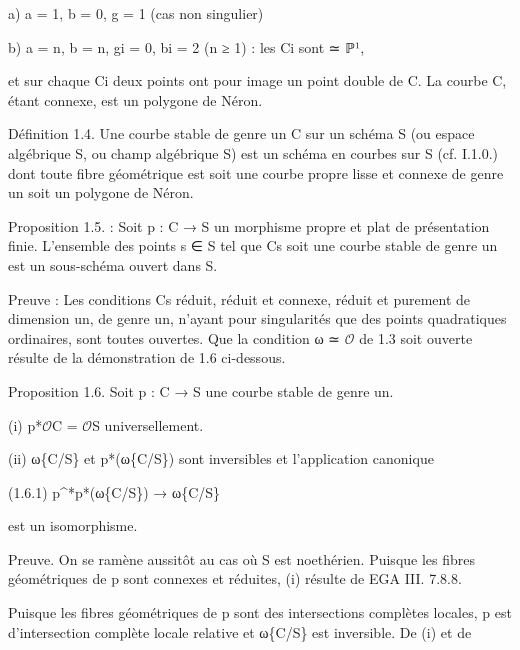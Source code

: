 \documentclass[11pt,a4paper]{article}
\begin{document}
a)    a = 1, b = 0, g = 1        (cas non singulier)

b)    a = n, b = n, g\textunderscore{}i = 0, b\textunderscore{}i = 2        (n ≥ 1) : les C\textunderscore{}i sont ≃ ℙ¹,

et sur chaque C\textunderscore{}i deux points ont pour image un point double de C. La courbe C, étant connexe, est un polygone de Néron.

Définition 1.4.     Une courbe stable de genre un C sur un schéma S (ou espace algébrique S, ou champ algébrique S) est un schéma en courbes sur S (cf. I.1.0.) dont toute fibre géométrique est soit une courbe propre lisse et connexe de genre un soit un polygone de Néron.

Proposition 1.5. : Soit p : C → S un morphisme propre et plat de présentation finie. L'ensemble des points s ∈ S tel que C\textunderscore{}s soit une courbe stable de genre un est un sous-schéma ouvert dans S.

Preuve : Les conditions C\textunderscore{}s réduit, réduit et connexe, réduit et purement de dimension un, de genre un, n'ayant pour singularités que des points quadratiques ordinaires, sont toutes ouvertes. Que la condition ω ≃ \ensuremath{\mathcal{O}} de 1.3 soit ouverte résulte de la démonstration de 1.6 ci-dessous.

Proposition 1.6.     Soit p : C → S une courbe stable de genre un.

(i)    p\textunderscore{}*\ensuremath{\mathcal{O}}\textunderscore{}C = \ensuremath{\mathcal{O}}\textunderscore{}S universellement.

(ii)   ω\textunderscore{}\{C/S\} et p\textunderscore{}*(ω\textunderscore{}\{C/S\}) sont inversibles et l'application canonique

(1.6.1)        p\textasciicircum{}*p\textunderscore{}*(ω\textunderscore{}\{C/S\}) → ω\textunderscore{}\{C/S\}

est un isomorphisme.

Preuve.     On se ramène aussitôt au cas où S est noethérien. Puisque les fibres géométriques de p sont connexes et réduites, (i) résulte de EGA III. 7.8.8.

Puisque les fibres géométriques de p sont des intersections complètes locales, p est d'intersection complète locale relative et ω\textunderscore{}\{C/S\} est inversible. De (i) et de
\end{document}
